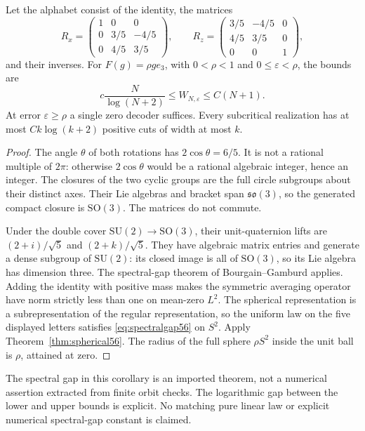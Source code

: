 \begin{corollary}\label{cor:SO356}
Let the alphabet consist of the identity, the matrices
\[
 R_x=\begin{pmatrix}1&0&0\\0&3/5&-4/5\\0&4/5&3/5\end{pmatrix},
 \qquad
 R_z=\begin{pmatrix}3/5&-4/5&0\\4/5&3/5&0\\0&0&1\end{pmatrix},
\]
and their inverses. For $F(g)=\rho g e_3$, with $0<\rho<1$ and $0\le\varepsilon<\rho$, the bounds are
\[
             c\frac{N}{\log(N+2)}\le W_{N,\varepsilon}\le C(N+1).
\]
At error $\varepsilon\ge\rho$ a single zero decoder suffices. Every subcritical realization has at most $Ck\log(k+2)$ positive cuts of width at most $k$.
\end{corollary}
\begin{proof}
The angle $\theta$ of both rotations has $2\cos\theta=6/5$. It is not a rational multiple of $2\pi$: otherwise $2\cos\theta$ would be a rational algebraic integer, hence an integer. The closures of the two cyclic groups are the full circle subgroups about their distinct axes. Their Lie algebras and bracket span $\mathfrak{so}(3)$, so the generated compact closure is $\mathrm{SO}(3)$. The matrices do not commute.

Under the double cover $\mathrm{SU}(2)\to\mathrm{SO}(3)$, their unit-quaternion lifts are $(2+i)/\sqrt5$ and $(2+k)/\sqrt5$. They have algebraic matrix entries and generate a dense subgroup of $\mathrm{SU}(2)$: its closed image is all of $\mathrm{SO}(3)$, so its Lie algebra has dimension three. The spectral-gap theorem of Bourgain--Gamburd \cite{BG2012} applies. Adding the identity with positive mass makes the symmetric averaging operator have norm strictly less than one on mean-zero $L^2$. The spherical representation is a subrepresentation of the regular representation, so the uniform law on the five displayed letters satisfies \eqref{eq:spectralgap56} on $S^2$. Apply Theorem~\ref{thm:spherical56}. The radius of the full sphere $\rho S^2$ inside the unit ball is $\rho$, attained at zero.
\end{proof}
The spectral gap in this corollary is an imported theorem, not a numerical assertion extracted from finite orbit checks. The logarithmic gap between the lower and upper bounds is explicit. No matching pure linear law or explicit numerical spectral-gap constant is claimed.
